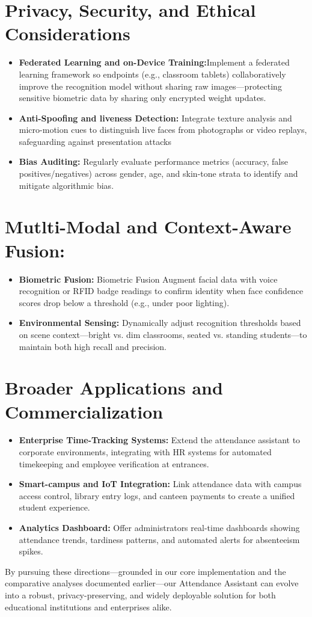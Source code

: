 \documentclass[openany]{report}
\begin{document}
\section{Privacy, Security, and Ethical Considerations}
\begin{itemize}
    \item \textbf{Federated Learning and on-Device Training:}Implement a federated learning framework so endpoints (e.g., classroom tablets) collaboratively improve the recognition model without sharing raw images—protecting sensitive biometric data by sharing only encrypted weight updates.
    \item \textbf{Anti-Spoofing and liveness Detection:} Integrate texture analysis and micro-motion cues to distinguish live faces from photographs or video replays, safeguarding against presentation attacks
    \item \textbf{Bias Auditing:} Regularly evaluate performance metrics (accuracy, false positives/negatives) across gender, age, and skin-tone strata to identify and mitigate algorithmic bias.
\end{itemize}
\section{Mutlti-Modal and Context-Aware Fusion:}
\begin{itemize}
    \item \textbf{Biometric Fusion:} Biometric Fusion
    Augment facial data with voice recognition or RFID badge readings to confirm identity when face confidence scores drop below a threshold (e.g., under poor lighting).
    \item \textbf{Environmental Sensing:} Dynamically adjust recognition thresholds based on scene context—bright vs. dim classrooms, seated vs. standing students—to maintain both high recall and precision.
\end{itemize}

\section{Broader Applications and Commercialization}
\begin{itemize}
    \item \textbf{Enterprise Time-Tracking Systems:} Extend the attendance assistant to corporate environments, integrating with HR systems for automated timekeeping and employee verification at entrances.
    \item \textbf{Smart-campus and IoT Integration:} Link attendance data with campus access control, library entry logs, and canteen payments to create a unified student experience.
    \item \textbf{Analytics Dashboard:} Offer administrators real-time dashboards showing attendance trends, tardiness patterns, and automated alerts for absenteeism spikes.
\end{itemize}
By pursuing these directions—grounded in our core implementation and the comparative analyses documented earlier—our Attendance Assistant can evolve into a robust, privacy-preserving, and widely deployable solution for both educational institutions and enterprises alike.
\end{document}
